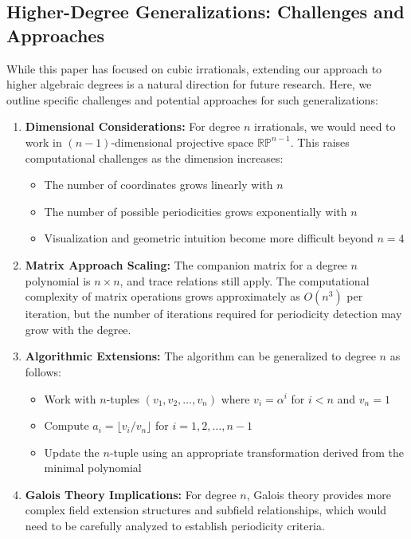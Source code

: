 \subsection{Higher-Degree Generalizations: Challenges and Approaches}

While this paper has focused on cubic irrationals, extending our approach to higher algebraic degrees is a natural direction for future research. Here, we outline specific challenges and potential approaches for such generalizations:

\begin{enumerate}
    \item \textbf{Dimensional Considerations:} For degree $n$ irrationals, we would need to work in $(n-1)$-dimensional projective space $\mathbb{RP}^{n-1}$. This raises computational challenges as the dimension increases:
    \begin{itemize}
        \item The number of coordinates grows linearly with $n$
        \item The number of possible periodicities grows exponentially with $n$
        \item Visualization and geometric intuition become more difficult beyond $n=4$
    \end{itemize}
    
    \item \textbf{Matrix Approach Scaling:} The companion matrix for a degree $n$ polynomial is $n \times n$, and trace relations still apply. The computational complexity of matrix operations grows approximately as $O(n^3)$ per iteration, but the number of iterations required for periodicity detection may grow with the degree.
    
    \item \textbf{Algorithmic Extensions:} The \HAPD{} algorithm can be generalized to degree $n$ as follows:
    \begin{itemize}
        \item Work with $n$-tuples $(v_1, v_2, \ldots, v_n)$ where $v_i = \alpha^i$ for $i < n$ and $v_n = 1$
        \item Compute $a_i = \lfloor v_i/v_n \rfloor$ for $i = 1, 2, \ldots, n-1$
        \item Update the $n$-tuple using an appropriate transformation derived from the minimal polynomial
    \end{itemize}
    
    \item \textbf{Galois Theory Implications:} For degree $n$, Galois theory provides more complex field extension structures and subfield relationships, which would need to be carefully analyzed to establish periodicity criteria.
\end{enumerate}

